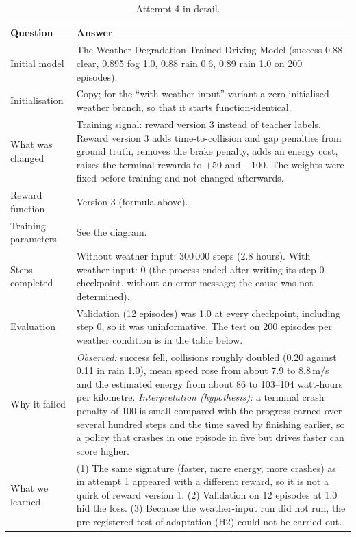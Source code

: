 \begin{table}[H]\centering\small
\caption{Attempt 4 in detail.}\label{tab:rl4}
\begin{tabularx}{\textwidth}{@{}>{\raggedright\arraybackslash}p{3.4cm}X@{}}\toprule
Question & Answer\\\midrule
Initial model & The Weather-Degradation-Trained Driving Model (success 0.88 clear, 0.895 fog 1.0, 0.88 rain 0.6, 0.89 rain 1.0 on 200 episodes).\\
Initialisation & Copy; for the ``with weather input'' variant a zero-initialised weather branch, so that it starts function-identical.\\
What was changed & Training signal: reward version 3 instead of teacher labels. Reward version 3 adds time-to-collision and gap penalties from ground truth, removes the brake penalty, adds an energy cost, raises the terminal rewards to $+50$ and $-100$. The weights were fixed before training and not changed afterwards.\\
Reward function & Version 3 (formula above).\\
Training parameters & See the diagram.\\
Steps completed & Without weather input: 300\,000 steps (2.8 hours). With weather input: 0 (the process ended after writing its step-0 checkpoint, without an error message; the cause was not determined).\\
Evaluation & Validation (12 episodes) was 1.0 at every checkpoint, including step 0, so it was uninformative. The test on 200 episodes per weather condition is in the table below.\\
Why it failed & \emph{Observed:} success fell, collisions roughly doubled (0.20 against 0.11 in rain 1.0), mean speed rose from about 7.9 to 8.8\,m/s and the estimated energy from about 86 to 103--104 watt-hours per kilometre. \emph{Interpretation (hypothesis):} a terminal crash penalty of 100 is small compared with the progress earned over several hundred steps and the time saved by finishing earlier, so a policy that crashes in one episode in five but drives faster can score higher.\\
What we learned & (1) The same signature (faster, more energy, more crashes) as in attempt 1 appeared with a different reward, so it is not a quirk of reward version 1. (2) Validation on 12 episodes at 1.0 hid the loss. (3) Because the weather-input run did not run, the pre-registered test of adaptation (H2) could not be carried out.\\\bottomrule
\end{tabularx}
\end{table}
\resizebox{\textwidth}{!}{}

